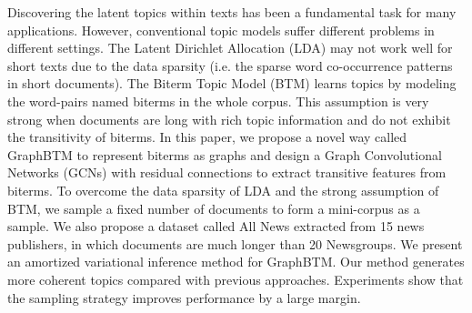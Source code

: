 Discovering the latent topics within texts has been a fundamental task for many applications. However, conventional topic models suffer different problems in different settings. The Latent Dirichlet Allocation (LDA) may not work well for short texts due to the data sparsity (i.e. the sparse word co-occurrence patterns in short documents). The Biterm Topic Model (BTM) learns topics by modeling the word-pairs named biterms in the whole corpus. This assumption is very strong when documents are long with rich topic information and do not exhibit the transitivity of biterms. In this paper, we propose a novel way called GraphBTM to represent biterms as graphs and design a Graph Convolutional Networks (GCNs) with residual connections to extract transitive features from biterms. To overcome the data sparsity of LDA and the strong assumption of BTM, we sample a fixed number of documents to form a mini-corpus as a sample. We also propose a dataset called All News extracted from 15 news publishers, in which documents are much longer than 20 Newsgroups. We present an amortized variational inference method for GraphBTM. Our method generates more coherent topics compared with previous approaches. Experiments show that the sampling strategy improves performance by a large margin.
